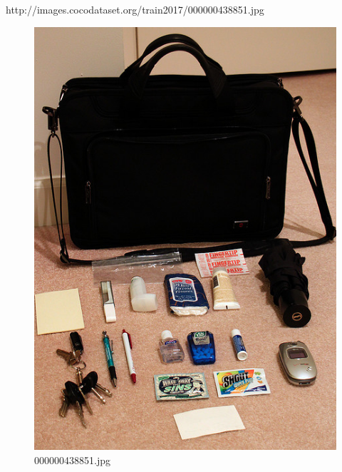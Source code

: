 http://images.cocodataset.org/train2017/000000438851.jpg
\begin{figure}[h]
    \centering
    \includegraphics[width=0.8\linewidth]{../image set/hard/000000438851.jpg}
    \caption{000000438851.jpg}
\end{figure}
